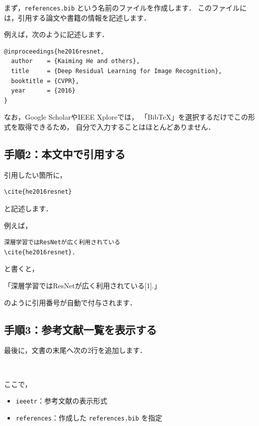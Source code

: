 \documentclass[a4paper,twocolumn]{jsarticle}
\begin{document}
まず，\texttt{references.bib} という名前のファイルを作成します．
このファイルには，引用する論文や書籍の情報を記述します．

例えば，次のように記述します．

\begin{verbatim}
@inproceedings{he2016resnet,
  author    = {Kaiming He and others},
  title     = {Deep Residual Learning for Image Recognition},
  booktitle = {CVPR},
  year      = {2016}
}
\end{verbatim}

なお，Google ScholarやIEEE Xploreでは，
「BibTeX」を選択するだけでこの形式を取得できるため，
自分で入力することはほとんどありません．

\subsection*{手順2：本文中で引用する}

引用したい箇所に，

\begin{verbatim}
\cite{he2016resnet}
\end{verbatim}

と記述します．

例えば，

\begin{verbatim}
深層学習ではResNetが広く利用されている
\cite{he2016resnet}.
\end{verbatim}

と書くと，

「深層学習ではResNetが広く利用されている[1].」

のように引用番号が自動で付与されます．

\subsection*{手順3：参考文献一覧を表示する}

最後に，文書の末尾へ次の2行を追加します．

\begin{verbatim}


\end{verbatim}

ここで，

\begin{itemize}
    \item \texttt{ieeetr}：参考文献の表示形式
    \item \texttt{references}：作成した \texttt{references.bib} を指定
\end{itemize}
\end{document}
